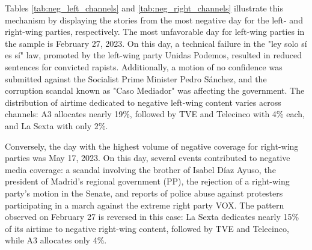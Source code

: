 \documentclass[12pt]{article}
\begin{document}

	




	
	
	
Tables \ref{tab:neg_left_channels} and \ref{tab:neg_right_channels} illustrate this mechanism by displaying the stories from the most negative day for the left- and right-wing parties, respectively. The most unfavorable day for left-wing parties in the sample is February 27, 2023. On this day, a technical failure in the "ley solo sí es sí" law, promoted by the left-wing party Unidas Podemos, resulted in reduced sentences for convicted rapists. Additionally, a motion of no confidence was submitted against the Socialist Prime Minister Pedro Sánchez, and the corruption scandal known as "Caso Mediador" was affecting the government. The distribution of airtime dedicated to negative left-wing content varies across channels: A3 allocates nearly 19\%, followed by TVE and Telecinco with 4\% each, and La Sexta with only 2\%.

Conversely, the day with the highest volume of negative coverage for right-wing parties was May 17, 2023. On this day, several events contributed to negative media coverage: a scandal involving the brother of Isabel Díaz Ayuso, the president of Madrid’s regional government (PP), the rejection of a right-wing party’s motion in the Senate, and reports of police abuse against protesters participating in a march against the extreme right party VOX. The pattern observed on February 27 is reversed in this case: La Sexta dedicates nearly 15\% of its airtime to negative right-wing content, followed by TVE and Telecinco, while A3 allocates only 4\%.
	
\end{document}
